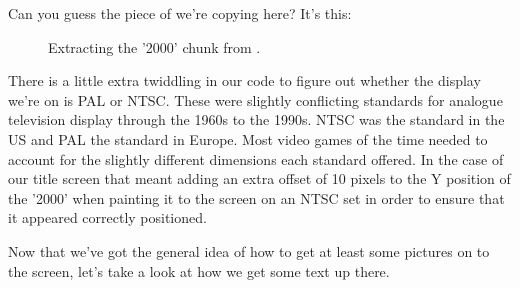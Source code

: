 Can you guess the piece of  we're copying here? It's this:


\begin{figure}[H]
    \centering
    \begin{adjustbox}{width=12cm,center}
      \hspace{0.5cm}
      \hspace{0.5cm}
    \end{adjustbox}
  \caption{Extracting the '2000' chunk from .}
\end{figure}

There is a little extra twiddling in our code to figure out whether the display we're on is PAL or NTSC. These were slightly conflicting standards for
analogue television display through the 1960s to the 1990s. NTSC was the standard in the US and PAL the standard in Europe. Most video games of the time 
needed to account for the slightly different dimensions each standard offered. In the case of our title screen that meant adding an extra offset of 10
pixels to the Y position of the '2000' when painting it to the screen on an NTSC set in order to ensure that it appeared correctly positioned.

Now that we've got the general idea of how to get at least some pictures on to the screen, let's take a look at how we get some text up there.


